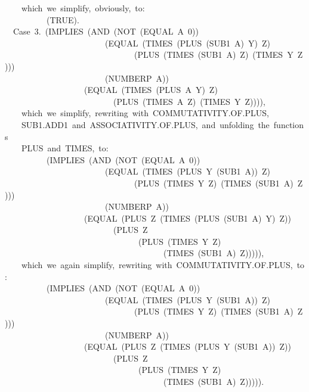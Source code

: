 \documentclass[11pt]{book}
\newenvironment{pubasis}{\begin{flushleft}\ttfamily\small}{\normalsize\rmfamily\end{flushleft}}
\begin{document}
\begin{pubasis}
~~~~which~we~simplify,~obviously,~to:\\

~~~~~~~~~~(TRUE).\\

~~Case~3.~(IMPLIES~(AND~(NOT~(EQUAL~A~0))\\
~~~~~~~~~~~~~~~~~~~~~~~~(EQUAL~(TIMES~(PLUS~(SUB1~A)~Y)~Z)\\
~~~~~~~~~~~~~~~~~~~~~~~~~~~~~~~(PLUS~(TIMES~(SUB1~A)~Z)~(TIMES~Y~Z)))\\
~~~~~~~~~~~~~~~~~~~~~~~~(NUMBERP~A))\\
~~~~~~~~~~~~~~~~~~~(EQUAL~(TIMES~(PLUS~A~Y)~Z)\\
~~~~~~~~~~~~~~~~~~~~~~~~~~(PLUS~(TIMES~A~Z)~(TIMES~Y~Z)))),\\

~~~~which~we~simplify,~rewriting~with~COM\-MU\-TA\-TIV\-ITY.OF.PLUS,\\
~~~~SUB1.ADD1~and~ASSOC\-IATIV\-ITY.OF.PLUS,~and~unfolding~the~functions\\
~~~~PLUS~and~TIMES,~to:\\

~~~~~~~~~~(IMPLIES~(AND~(NOT~(EQUAL~A~0))\\
~~~~~~~~~~~~~~~~~~~~~~~~(EQUAL~(TIMES~(PLUS~Y~(SUB1~A))~Z)\\
~~~~~~~~~~~~~~~~~~~~~~~~~~~~~~~(PLUS~(TIMES~Y~Z)~(TIMES~(SUB1~A)~Z)))\\
~~~~~~~~~~~~~~~~~~~~~~~~(NUMBERP~A))\\
~~~~~~~~~~~~~~~~~~~(EQUAL~(PLUS~Z~(TIMES~(PLUS~(SUB1~A)~Y)~Z))\\
~~~~~~~~~~~~~~~~~~~~~~~~~~(PLUS~Z\\
~~~~~~~~~~~~~~~~~~~~~~~~~~~~~~~~(PLUS~(TIMES~Y~Z)\\
~~~~~~~~~~~~~~~~~~~~~~~~~~~~~~~~~~~~~~(TIMES~(SUB1~A)~Z))))),\\

~~~~which~we~again~simplify,~rewriting~with~COM\-MU\-TA\-TIV\-ITY.OF.PLUS,~to:\\

~~~~~~~~~~(IMPLIES~(AND~(NOT~(EQUAL~A~0))\\
~~~~~~~~~~~~~~~~~~~~~~~~(EQUAL~(TIMES~(PLUS~Y~(SUB1~A))~Z)\\
~~~~~~~~~~~~~~~~~~~~~~~~~~~~~~~(PLUS~(TIMES~Y~Z)~(TIMES~(SUB1~A)~Z)))\\
~~~~~~~~~~~~~~~~~~~~~~~~(NUMBERP~A))\\
~~~~~~~~~~~~~~~~~~~(EQUAL~(PLUS~Z~(TIMES~(PLUS~Y~(SUB1~A))~Z))\\
~~~~~~~~~~~~~~~~~~~~~~~~~~(PLUS~Z\\
~~~~~~~~~~~~~~~~~~~~~~~~~~~~~~~~(PLUS~(TIMES~Y~Z)\\
~~~~~~~~~~~~~~~~~~~~~~~~~~~~~~~~~~~~~~(TIMES~(SUB1~A)~Z))))).\\


\end{pubasis}
\end{document}
